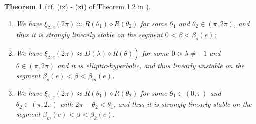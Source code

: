 \documentclass[11pt]{article}
\newtheorem{theorem}[lemma]{Theorem}
\def\nn{\nonumber}
\def\aa{{\alpha}}
\begin{document}
\begin{theorem}[cf. (ix) - (xi) of Theorem 1.2 in \cite{HLS}]
\begin{enumerate}[label = (\roman*)]
       \item 
       We have $\xi_{\beta, e}(2 \pi) \approx R\left(\theta_{1}\right) \diamond R\left(\theta_{2}\right)$ for some $\theta_{1}$ and $\theta_{2} \in(\pi, 2 \pi)$, and thus it is strongly linearly stable on the segment $0<\beta<\beta_s(e)$; 
       \item We have $\left.\xi_{\beta, e}(2 \pi) \approx D(\lambda) \diamond R(\theta)\right)$ for some $0>\lambda \neq-1$ and $\theta \in(\pi, 2 \pi)$ and it is elliptic-hyperbolic, and thus linearly unstable on the segment $\beta_{s}(e)<\beta<\beta_{m}(e)$.
       \item  We have $\xi_{\beta, e}(2 \pi) \approx R\left(\theta_{1}\right) \diamond R\left(\theta_{2}\right)$ for some $\theta_{1} \in(0, \pi)$ and $\theta_{2} \in(\pi, 2 \pi)$ with $2 \pi-\theta_{2}<\theta_{1}$, and thus it is strongly linearly stable on the segment $\beta_{m}(e)<\beta<\beta_k(e)$.
\end{enumerate}
\end{theorem}

\end{document}
